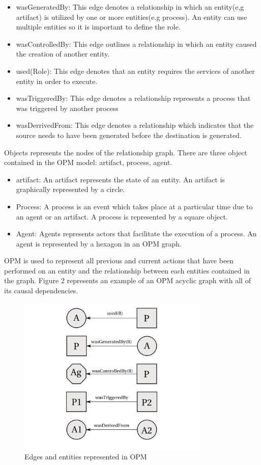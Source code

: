 \begin{itemize}
\item wasGeneratedBy: This edge denotes a  relationship in which an entity(e,g artifact) is utilized by one or  more entities(e.g process). An entity can use multiple entities so it is important to define the role.  
\item wasControlledBy: This edge outlines a relationship in which an entity caused the creation of another entity.
\item used(Role): This edge denotes that an entity requires the services of another entity in order to execute.
\item wasTriggeredBy: This edge denotes a relationship represents a process that was triggered by another process
\item wasDerrivedFrom: This edge denotes a relationship which indicates that the source needs to have been generated before the destination is generated.
\end{itemize}

 Objects represents the nodes of the relationship graph. There are three object contained in the OPM model: artifact, process, agent. 

\begin{itemize}
\item
artifact: An artifact represents the state of an entity. An artifact is graphically represented by a circle.

\item
Process: A process is an event which takes place at a particular time due to an agent or an artifact. A process is represented by a square object.

\item 
Agent: Agents represents actors that facilitate the execution of a process. An agent is represented by a hexagon in an OPM graph.
\end{itemize}

OPM is used to represent all previous and current actions that have been performed on an entity and  the relationship between each entities contained in the graph. Figure 2 represents an example of an OPM acyclic graph with all of its causal dependencies.  

\begin{figure}[h]
\begin{center}
\includegraphics[height=3.0in]{opm_convention.PNG}
\end{center}
\caption{Edges and entities represented in OPM}
\label{autom}
\end{figure}

